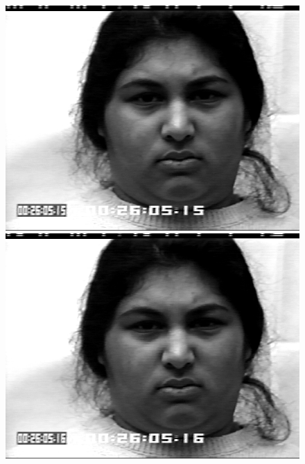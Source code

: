\documentclass[12pt, a4paper]{scrbook}
\begin{document}
\begin{figure}[h]
\begin{minipage}[b]{.2\linewidth}
		\includegraphics[width=\linewidth]{Bilder/Disgust3.png}
	\end{minipage}
	\hspace{.025\linewidth}%
	\begin{minipage}[b]{.2\linewidth} %
		\includegraphics[width=\linewidth]{Bilder/Disgust4.png}
	\end{minipage}
	\newline
	\begin{minipage}[b]{.2\linewidth} %

\end{minipage}
\end{figure}
\end{document}
